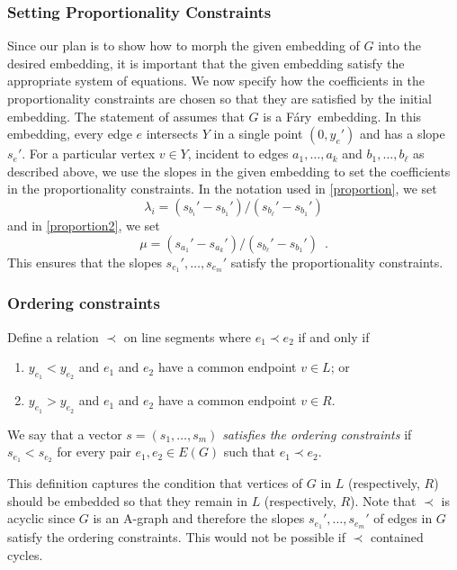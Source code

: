 \documentclass{patmorin}
\newcommand{\Fary}{Fáry}
\begin{document}
\subsubsection{Setting Proportionality Constraints}

Since our plan is to show how to morph the given embedding of $G$ into the desired embedding, it is important that the given embedding satisfy the appropriate system of equations.  
We now specify how the coefficients in the proportionality constraints
are chosen so that they are satisfied by the initial embedding.  The statement of  assumes that $G$ is a
\Fary\ embedding.  In this embedding, every edge $e$ intersects $Y$
in a single point $(0,y_e')$ and has a slope $s_e'$.  For a particular
vertex $v\in Y$, incident to edges $a_1,\ldots,a_k$ and $b_1,\ldots,b_\ell$
as described above, we use the slopes in the given embedding to set the
coefficients in the proportionality constraints.  In the notation used
in \eqref{proportion}, we set
\[
    \lambda_i = (s_{b_i}'-s_{b_1}')/(s_{b_\ell}'-s_{b_1}') 
\]
and in \eqref{proportion2}, we set
\[
    \mu = (s_{a_1}'-s_{a_k}')/(s_{b_\ell}'-s_{b_1}') \enspace .
\]
This ensures that the slopes $s_{e_1}',\ldots,s_{e_m}'$ satisfy the
proportionality constraints.


\subsubsection{Ordering constraints}

Define a relation $\prec$ on line segments where
$e_1 \prec e_2$
if and only if
\begin{enumerate}
  \item $y_{e_1} < y_{e_2}$ and $e_1$ and $e_2$ have a common endpoint $v\in L$; or
  \item $y_{e_1} > y_{e_2}$ and $e_1$ and $e_2$ have a common endpoint $v\in R$.
\end{enumerate}
We say that a vector $s=(s_1,\ldots,s_m)$ \emph{satisfies the ordering
constraints} if $s_{e_1} < s_{e_2}$ for every pair $e_1,e_2\in E(G)$
such that $e_1\prec e_2$.

This definition captures the condition that vertices of $G$ in $L$
(respectively, $R$) should be embedded so that they remain in $L$
(respectively, $R$).  Note that $\prec$ is acyclic since $G$ is an
A-graph and therefore the slopes $s_{e_1}',\ldots,s_{e_m}'$ of edges
in $G$ satisfy the ordering constraints.  This would not be possible if
$\prec$ contained cycles.
\end{document}
